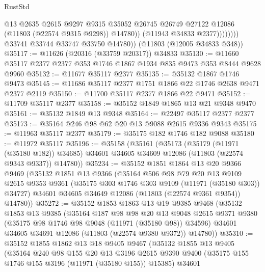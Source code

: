 \begin{lexlean}{RustStd}
\begin{coremodule}
                          @13
                          @2635
                          @2615
                          @9297
                          @9315
                          @35052
                          @26745
                          @26749
                          @27122
                          @12086
                          (@11803 (@22574 @9315 @9298))
                          @14780))
                      (@11943 @34833 @2377))))))))
        @33741
        @33744
        @33747
        @33750
        @14780))
    (@11803 (@12005 @34833 @348))
@35117 := @11626 (@20316 (@33759 @20317)) @34833
@35130 := @11660 @35117 @2377 @2377 @353 @1746 @1867 @1934 @835 @9473 @353 @8444 @9628 @9960
@35132 := @11677 @35117 @2377
@35135 := @35132 @1867 @1746 @9473
@35145 := @11686 @35117 @2377 @1751 @1866 @22 @1746 @2638 @9471 @2377 @2119
@35150 := @11700 @35117 @2377 @1866 @22 @9471
@35152 := @11709 @35117 @2377
@35158 := @35152 @1849 @1865 @13 @21 @9348 @9470
@35161 := @35132 @1849 @13 @9348
@35164 := @22497 @35117 @2377 @2377
@35173 := @35164 @246 @98 @62 @20 @13 @9088 @2615 @9336 @9343
@35175 := @11963 @35117 @2377
@35179 := @35175 @182 @1746 @182 @9088
@35180 := @11972 @35117
@35196 := @35158
    (@35161
      (@35173
        (@35179 (@11971 (@35180 @182)) @34685)
        @34601
        @34605
        @34609
        @12086
        (@11803 (@22574 @9343 @9337))
        @14780))
@35234 := @35152
    @1851
    @1864
    @13
    @20
    @9366
    @9469
    (@35132
      @1851
      @13
      @9366
      (@35164
        @506
        @98
        @79
        @20
        @13
        @9109
        @2615
        @9353
        @9361
        (@35175 @303 @1746 @303 @9109 (@11971 (@35180 @303)) @34727)
        @34601
        @34605
        @34649
        @12086
        (@11803 (@22574 @9361 @9354))
        @14780))
@35272 := @35152
    @1853
    @1863
    @13
    @19
    @9385
    @9468
    (@35132
      @1853
      @13
      @9385
      (@35164
        @187
        @98
        @98
        @20
        @13
        @9048
        @2615
        @9371
        @9380
        (@35175 @98 @1746 @98 @9048 (@11971 (@35180 @98)) @34596)
        @34601
        @34605
        @34691
        @12086
        (@11803 (@22574 @9380 @9372))
        @14780))
@35310 := @35152
    @1855
    @1862
    @13
    @18
    @9405
    @9467
    (@35132
      @1855
      @13
      @9405
      (@35164
        @240
        @98
        @155
        @20
        @13
        @3196
        @2615
        @9390
        @9400
        (@35175 @155 @1746 @155 @3196 (@11971 (@35180 @155)) @15385)
        @34601

\end{coremodule}
\end{lexlean}
